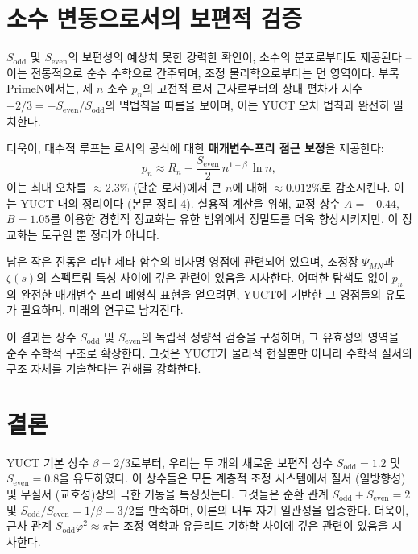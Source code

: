 \documentclass[11pt,a4paper]{article}
\begin{document}
	\section{소수 변동으로서의 보편적 검증}
	\label{sec:primes}
	
	\(S_{\mathrm{odd}}\) 및 \(S_{\mathrm{even}}\)의 보편성의 예상치 못한 강력한 확인이, 소수의 분포로부터도 제공된다 -- 이는 전통적으로 순수 수학으로 간주되며, 조정 물리학으로부터는 먼 영역이다. 부록 PrimeN에서는, 제 \(n\) 소수 \(p_n\)의 고전적 로서 근사로부터의 상대 편차가 지수 \(-2/3 = -S_{\mathrm{even}}/S_{\mathrm{odd}}\)의 멱법칙을 따름을 보이며, 이는 YUCT 오차 법칙과 완전히 일치한다.
	
	더욱이, 대수적 루프는 로서의 공식에 대한 \textbf{매개변수-프리 점근 보정}을 제공한다:
	\[
	p_n \approx R_n - \frac{S_{\mathrm{even}}}{2}\, n^{1-\beta}\,\ln n,
	\]
	이는 최대 오차를 \(\approx 2.3\%\) (단순 로서)에서 큰 \(n\)에 대해 \(\approx 0.012\%\)로 감소시킨다. 이는 YUCT 내의 정리이다 (본문 정리 4). 실용적 계산을 위해, 교정 상수 \(A=-0.44\), \(B=1.05\)를 이용한 경험적 정교화는 유한 범위에서 정밀도를 더욱 향상시키지만, 이 정교화는 도구일 뿐 정리가 아니다.
	
	남은 작은 진동은 리만 제타 함수의 비자명 영점에 관련되어 있으며, 조정장 \(\Psi_{MN}\)과 \(\zeta(s)\)의 스펙트럼 특성 사이에 깊은 관련이 있음을 시사한다. 어떠한 탐색도 없이 \(p_n\)의 완전한 매개변수-프리 폐형식 표현을 얻으려면, YUCT에 기반한 그 영점들의 유도가 필요하며, 미래의 연구로 남겨진다.
	
	이 결과는 상수 \(S_{\mathrm{odd}}\) 및 \(S_{\mathrm{even}}\)의 독립적 정량적 검증을 구성하며, 그 유효성의 영역을 순수 수학적 구조로 확장한다. 그것은 YUCT가 물리적 현실뿐만 아니라 수학적 질서의 구조 자체를 기술한다는 견해를 강화한다.
	
	\section{결론}
	YUCT 기본 상수 \(\beta = 2/3\)로부터, 우리는 두 개의 새로운 보편적 상수 \(S_{\text{odd}} = 1.2\) 및 \(S_{\text{even}} = 0.8\)을 유도하였다. 이 상수들은 모든 계층적 조정 시스템에서 질서 (일방향성) 및 무질서 (교호성)상의 극한 거동을 특징짓는다. 그것들은 순환 관계 \(S_{\text{odd}}+S_{\text{even}}=2\) 및 \(S_{\text{odd}}/S_{\text{even}} = 1/\beta = 3/2\)를 만족하며, 이론의 내부 자기 일관성을 입증한다. 더욱이, 근사 관계 \(S_{\text{odd}}\varphi^2 \approx \pi\)는 조정 역학과 유클리드 기하학 사이에 깊은 관련이 있음을 시사한다.
	
\end{document}
